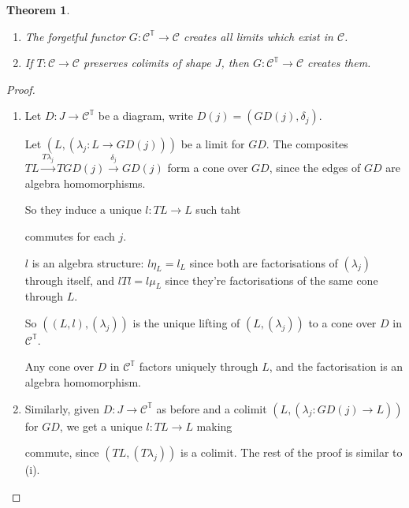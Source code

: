 \documentclass[a4paper]{article}
\newtheorem{theorem}[definition]{Theorem}
\numberwithin{definition}{section}
\begin{document}
\begin{theorem}
	\begin{enumerate}[label=\roman*.]
		\item The forgetful functor $G: \mathcal{C}^\mathbb{T} \to \mathcal{C}$ creates all limits which exist in $\mathcal{C}$.
		\item If $T: \mathcal{C} \to \mathcal{C}$ preserves colimits of shape $J$,
		then $G: \mathcal{C}^\mathbb{T} \to \mathcal{C}$ creates them.
	\end{enumerate}
\end{theorem}
\begin{proof}
	\begin{enumerate}[label=\roman*.]
		\item 
		Let $D: J \to \mathcal{C}^\mathbb{T}$ be a diagram,
		write $D(j) = (GD(j), \delta_j)$.
		
		Let $(L, (\lambda_j : L \to GD(j)))$ be a limit for $GD$.
		The composites $TL \overset{T\lambda_j}{\to} TGD(j) \overset{\delta_j}{\to} GD(j)$
		form a cone over $GD$,
		since the edges of $GD$ are algebra homomorphisms.
		
		So they induce a unique $l: TL \to L$ such taht
		\begin{center}
		\end{center}
		commutes for each $j$.
		
		$l$ is an algebra structure:
		$l\eta_L = l_L$ since both are factorisations of $(\lambda_j)$ through itself,
		and $lTl = l\mu_L$ since they're factorisations of the same cone through $L$.
		
		So $((L,l), (\lambda_j))$ is the unique lifting of $(L, (\lambda_j))$ to a cone over $D$ in $\mathcal{C}^\mathbb{T}$.
		
		Any cone over $D$ in $\mathcal{C}^\mathbb{T}$ factors uniquely through $L$,
		and the factorisation is an algebra homomorphism.
		
		\item
		Similarly, given $D:J \to \mathcal{C}^\mathbb{T}$ as before and a colimit $(L, (\lambda_j: GD(j) \to L))$ for $GD$,
		we get a unique $l: TL \to L$ making
		\begin{center}
		\end{center}
		commute, since $(TL, (T\lambda_j))$ is a colimit.
		The rest of the proof is similar to (i).
	\end{enumerate}
\end{proof}
\end{document}
